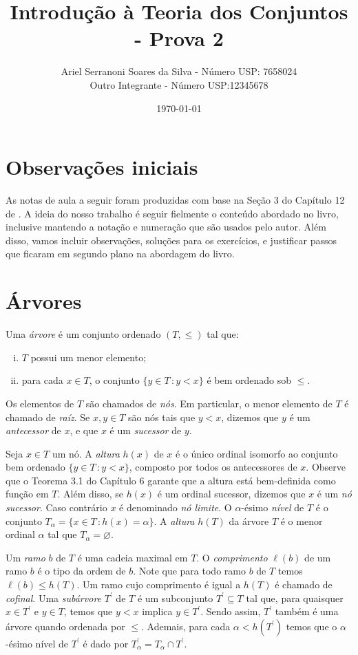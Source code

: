 \documentclass[a4paper]{article}
\title{Introdução à Teoria dos Conjuntos - Prova 2}
\author{Ariel Serranoni Soares da Silva  - Número USP: 7658024\\
Outro Integrante - Número USP:12345678}
\date{\today}
\begin{document}
\maketitle
\section*{Observações iniciais}

As notas de aula a seguir foram produzidas com base na Seção 3 do Capítulo 12 de
\cite{jech}. A ideia do nosso trabalho é seguir fielmente o conteúdo abordado no
livro, inclusive mantendo a notação e numeração que são usados pelo autor.
Além disso, vamos incluir observações, soluções para os exercícios, e justificar
passos que ficaram em segundo plano na abordagem do livro.

\setcounter{section}{2}
\section{Árvores}
\begin{definition}
  Uma \emph{árvore} é um conjunto ordenado \((T,\leq)\) tal que:
 \begin{enumerate}[(i)]
  \item \(T\) possui um menor elemento;
  \item para cada \(x\in T\), o conjunto \(\{y\in T\,\colon y<x\}\) é bem
    ordenado sob \(\leq\).
  \end{enumerate}
\end{definition}
Os elementos de \(T\) são chamados de \emph{nós}. Em particular,
o menor elemento de \(T\) é chamado  de \emph{raíz}.
Se \(x,y\in T\) são nós tais que  \(y<x\), dizemos que \(y\) é um
\emph{antecessor} de \(x\), e que \(x\) é um \emph{sucessor} de \(y\).

Seja \(x\in T\) um nó.  A \emph{altura} \(h(x)\) de \(x\) é o único ordinal
isomorfo ao conjunto bem ordenado \mbox{\(\{y\in T\,\colon
y<x\}\),} composto por todos os antecessores de \(x\). Observe que o Teorema 3.1
do Capítulo 6 garante que a altura está bem-definida como função em \(T\).
Além disso, se \(h(x)\) é um ordinal sucessor, dizemos que \(x\) é um
\emph{nó sucessor}. Caso contrário \(x\) é denominado \emph{nó limite}.
O \(\alpha\)-ésimo \emph{nível} de \(T\) é o conjunto
\(T_\alpha=\{x\in T \,\colon h(x)=\alpha\}\). A \emph{altura} \(h(T)\) da árvore
\(T\) é o menor ordinal \(\alpha\) tal que \(T_\alpha=\varnothing\).  

Um \emph{ramo} \(b\) de \(T\) é uma cadeia maximal em \(T\).  O \emph{comprimento}
\(\ell(b)\) de um ramo \(b\) é o tipo da ordem de \(b\). Note que para
todo ramo \(b\) de \(T\) temos \(\ell (b)\leq h(T)\).
Um ramo cujo comprimento é igual a \(h(T)\) é chamado de \emph{cofinal}.
Uma \emph{subárvore} \(T^\prime\) de \(T\) é um subconjunto
\(T^\prime\subseteq T\) tal que, para quaisquer \(x\in T^\prime\) e \(y\in T\),
temos que \(y<x\) implica \(y\in T^\prime\).
Sendo assim, \(T^\prime\) também é uma árvore quando ordenada por \(\leq\).
Ademais, para cada \(\alpha < h(T^\prime)\) temos que o \(\alpha\)-ésimo nível
de \(T^\prime\) é dado por \(T_\alpha^\prime= T_\alpha \cap T^\prime\).
\end{document}
